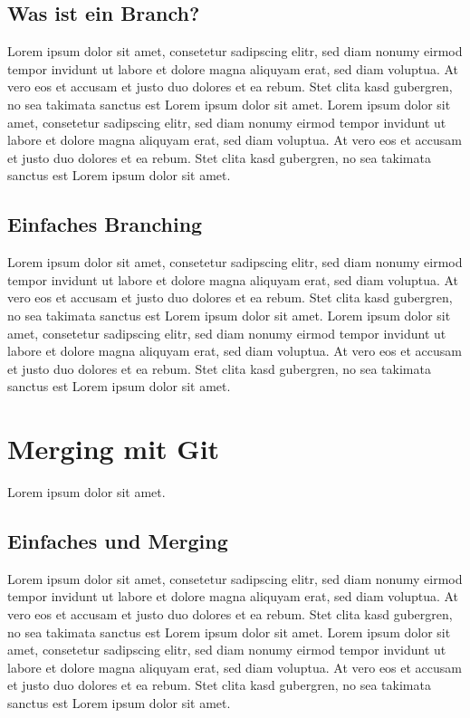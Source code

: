 \documentclass[12pt,a4paper,bibliography=totocnumbered,listof=totocnumbered]{scrartcl}
\begin{document}
\subsection{Was ist ein Branch?}
Lorem ipsum dolor sit amet, consetetur sadipscing elitr, sed diam nonumy eirmod tempor invidunt ut labore et dolore magna aliquyam erat, sed diam voluptua. At vero eos et accusam et justo duo dolores et ea rebum. Stet clita kasd gubergren, no sea takimata sanctus est Lorem ipsum dolor sit amet. Lorem ipsum dolor sit amet, consetetur sadipscing elitr, sed diam nonumy eirmod tempor invidunt ut labore et dolore magna aliquyam erat, sed diam voluptua. At vero eos et accusam et justo duo dolores et ea rebum. Stet clita kasd gubergren, no sea takimata sanctus est Lorem ipsum dolor sit amet.

\subsection{Einfaches Branching}
Lorem ipsum dolor sit amet, consetetur sadipscing elitr, sed diam nonumy eirmod tempor invidunt ut labore et dolore magna aliquyam erat, sed diam voluptua. At vero eos et accusam et justo duo dolores et ea rebum. Stet clita kasd gubergren, no sea takimata sanctus est Lorem ipsum dolor sit amet. Lorem ipsum dolor sit amet, consetetur sadipscing elitr, sed diam nonumy eirmod tempor invidunt ut labore et dolore magna aliquyam erat, sed diam voluptua. At vero eos et accusam et justo duo dolores et ea rebum. Stet clita kasd gubergren, no sea takimata sanctus est Lorem ipsum dolor sit amet.
\pagebreak

\section{Merging mit Git}
Lorem ipsum dolor sit amet.

\subsection{Einfaches und Merging}
Lorem ipsum dolor sit amet, consetetur sadipscing elitr, sed diam nonumy eirmod tempor invidunt ut labore et dolore magna aliquyam erat, sed diam voluptua. At vero eos et accusam et justo duo dolores et ea rebum. Stet clita kasd gubergren, no sea takimata sanctus est Lorem ipsum dolor sit amet. Lorem ipsum dolor sit amet, consetetur sadipscing elitr, sed diam nonumy eirmod tempor invidunt ut labore et dolore magna aliquyam erat, sed diam voluptua. At vero eos et accusam et justo duo dolores et ea rebum. Stet clita kasd gubergren, no sea takimata sanctus est Lorem ipsum dolor sit amet.
\pagebreak
\end{document}

